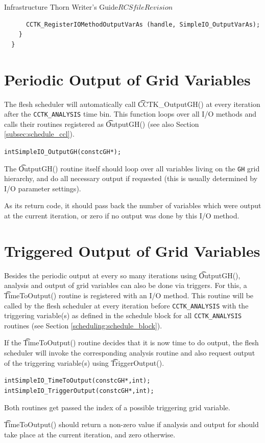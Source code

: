\begin{cactuspart}{Infrastructure Thorn Writer's Guide}{$RCSfile$}{$Revision$}
\begin{verbatim}
      CCTK_RegisterIOMethodOutputVarAs (handle, SimpleIO_OutputVarAs);
    }
  }
\end{verbatim}
%
%
\section{Periodic Output of Grid Variables}
%
The flesh scheduler will automatically call {\t CCTK\_OutputGH()} at every
iteration after the {\tt CCTK\_ANALYSIS} time bin. This function loops over all
I/O methods and calls their routines registered as {\t OutputGH()} (see also Section
\ref{subsec:schedule_ccl}).
%
\begin{alltt}
  int SimpleIO_OutputGH (const cGH *);
\end{alltt}
%
The {\t OutputGH()} routine itself should loop over all variables living on the
\texttt{GH} grid hierarchy, and do all necessary output if requested
(this is usually determined by I/O parameter settings).

As its return code, it should pass back the number of variables which were output
at the current iteration, or zero if no output was done by this I/O method.
%
%
\section{Triggered Output of Grid Variables}
%
Besides the periodic output at every so many iterations using {\t OutputGH()},
analysis and output of grid variables can also be done via triggers. For this,
a {\t TimeToOutput()} routine is registered with an I/O method.
This routine will be called by the flesh scheduler at every iteration before
{\tt CCTK\_ANALYSIS} with the triggering variable(s) as defined in the schedule
block for all {\tt CCTK\_ANALYSIS} routines (see Section \ref{scheduling:schedule_block}).

If the {\t TimeToOutput()} routine decides that it is now time to do output, the
flesh scheduler will invoke the corresponding analysis routine and also request
output of the triggering variable(s) using {\t TriggerOutput()}.
%
\begin{alltt}
  int SimpleIO_TimeToOutput (const cGH *, int );
  int SimpleIO_TriggerOutput (const cGH *, int );
\end{alltt}
%
Both routines get passed the index of a possible triggering grid variable.

{\t TimeToOutput()} should return a non-zero value if analysis and output
for \texttt{} should take place at the current iteration, and zero
otherwise.


\end{cactuspart}
